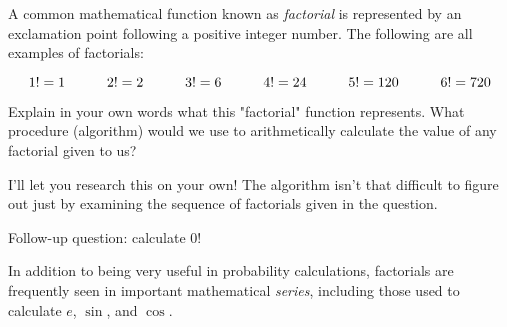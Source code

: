 

A common mathematical function known as {\it factorial} is represented by an exclamation point following a positive integer number.  The following are all examples of factorials:

$$1! = 1 \hbox{\hskip 30pt} 2! = 2 \hbox{\hskip 30pt} 3! = 6 \hbox{\hskip 30pt} 4! = 24 \hbox{\hskip 30pt} 5! = 120 \hbox{\hskip 30pt} 6! = 720$$

Explain in your own words what this "factorial" function represents.  What procedure (algorithm) would we use to arithmetically calculate the value of any factorial given to us?







I'll let you research this on your own!  The algorithm isn't that difficult to figure out just by examining the sequence of factorials given in the question.

\vskip 10pt

Follow-up question: calculate $0!$







In addition to being very useful in probability calculations, factorials are frequently seen in important mathematical {\it series}, including those used to calculate $e$, $\sin$, and $\cos$.




